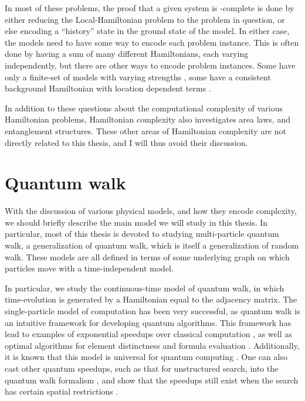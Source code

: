 \documentclass[../thesis-main/thesis-main]{subfiles}
\begin{document}
In most of these problems, the proof that a given system is \QMA-complete is done by either reducing the Local-Hamiltonian problem to the problem in question, or else encoding a ``history'' state in the ground state of the model.  In either case, the models need to have some way to encode each problem instance.  This is often done by having a sum of many different Hamiltonians, each varying independently, but there are other ways to encode problem instances.  Some have only a finite-set of models with varying strengths \cite{CM13}, some have a consistent background Hamiltonian with location dependent terms \cite{SV09}. 

In addition to these questions about the computational complexity of various Hamiltonian problems, Hamiltonian complexity also investigates area laws, and entanglement structures.  These other areas of Hamiltonian complexity are not directly related to this thesis, and I will thus avoid their discussion.



\section{Quantum walk}

With the discussion of various physical models, and how they encode complexity, we should briefly describe the main model we will study in this thesis.  In particular, most of this thesis is devoted to studying multi-particle quantum walk, a generalization of quantum walk, which is itself a generalization of random walk.  These models are all defined in terms of some underlying graph on which particles move with a time-independent model.  

In particular, we study the continuous-time model of quantum walk, in which time-evolution is generated by a Hamiltonian equal to the adjacency matrix.  The single-particle model of computation has been very successful, as quantum walk is an intuitive framework for developing quantum algorithms. This framework has lead to examples of exponential speedups over classical computation \cite{CCDFGS03}, as well as optimal algorithms for element distinctness \cite{Amb07} and formula evaluation \cite{FGG08}.  Additionally, it is known that this model is universal for quantum computing \cite{Chi09}.  One can also cast other quantum speedups, such as that for unstructured search, into the quantum walk formalism \cite{MNRS11}, and show that the speedups still exist when the search has certain spatial restrictions \cite{CG04}.
\end{document}
